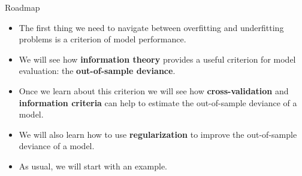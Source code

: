 \documentclass[handout]{beamer}
\begin{document}
\begin{frame}{Roadmap}
\scriptsize{

\begin{itemize}
\item The first thing we need to navigate between overfitting and underfitting problems is a criterion of model performance.

\item We will see how \textbf{information theory} provides a useful criterion for model evaluation: the \textbf{out-of-sample deviance}.

\item Once we learn about this criterion we will see how \textbf{cross-validation} and \textbf{information criteria} can help to estimate the out-of-sample deviance of a model.

\item We will also learn how to use \textbf{regularization} to improve the out-of-sample deviance of a model.

\item As usual, we will start with an example.

\end{itemize}


} 
\end{frame}
\end{document}
